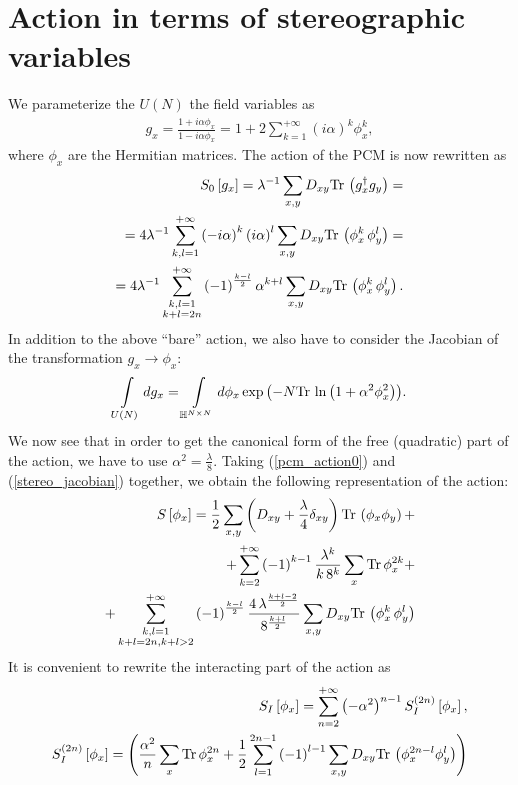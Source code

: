 \documentclass[12pt]{article}
\newcommand{\lr}[1]{ \left( #1 \right) }
\newcommand{\lrs}[1]{ \left[ #1 \right] }
\newcommand{\tr}{ {\rm Tr} \, }
\newcommand{\expa}[1]{ \exp{\left( #1 \right)} }
\begin{document}
\section{Action in terms of stereographic variables}
\label{sec:action_stereo}


 We parameterize the $U\lr{N}$ the field variables as
\begin{eqnarray}
\label{stereographic_projection}
 g_x
 =
 \frac{1 + i \alpha \phi_x}{1 - i \alpha \phi_x}
 =
 1 + 2 \sum\limits_{k=1}^{+\infty} \lr{i \alpha}^k \phi_x^k
,
\end{eqnarray}
where $\phi_x$ are the Hermitian matrices. The action of the PCM is now rewritten as
\begin{eqnarray}
\label{pcm_action0}
 S_0\lrs{g_x} = \lambda^{-1} \sum\limits_{x,y} D_{x y} \tr\lr{g^{\dag}_x g_y}
 = \nonumber\\ =
 4 \lambda^{-1} \sum\limits_{k,l=1}^{+\infty} \lr{-i \alpha}^k \lr{i \alpha}^l
      \sum\limits_{x,y} D_{xy} \tr\lr{\phi_x^k \, \phi_y^l}
 = \nonumber\\ =
 4 \lambda^{-1} \sum\limits_{\substack{k,l=1\\k+l=2 n}}^{+\infty}
  \lr{-1}^{\frac{k-l}{2}} \alpha^{k+l}
       \sum\limits_{x,y} D_{xy} \tr\lr{\phi_x^k \, \phi_y^l} .
\end{eqnarray}
In addition to the above ``bare'' action, we also have to consider the Jacobian of the transformation $g_x \rightarrow \phi_x$:
\begin{eqnarray}
\label{stereo_jacobian}
 \int\limits_{U\lr{N}} dg_x = \int\limits_{\mathbb{H}^{N\times N}} d\phi_x \expa{-N \tr\ln\lr{1 + \alpha^2 \phi_x^2}} .
\end{eqnarray}
We now see that in order to get the canonical form of the free (quadratic) part of the action, we have to use $\alpha^2 = \frac{\lambda}{8}$. Taking (\ref{pcm_action0}) and (\ref{stereo_jacobian}) together, we obtain the following representation of the action:
\begin{eqnarray}
\label{pcm_action}
 S\lrs{\phi_x} =
 \frac{1}{2} \sum\limits_{x,y} \lr{D_{xy} + \frac{\lambda}{4} \delta_{x y}} \tr\lr{\phi_x \phi_y}
 + \nonumber \\ +
 \sum\limits_{k=2}^{+\infty} \lr{-1}^{k-1} \frac{\lambda^{k}}{k \, 8^k} \sum\limits_x \tr \phi_x^{2 k}
 + \nonumber \\ +
 \sum\limits_{\substack{k,l=1\\k+l=2 n,k+l>2}}^{+\infty}
  \lr{-1}^{\frac{k-l}{2}} \frac{4 \, \lambda^{\frac{k+l-2}{2}}}{8^{\frac{k+l}{2}}}
       \sum\limits_{x,y} D_{xy} \tr\lr{\phi_x^k \, \phi_y^l}
\end{eqnarray}
It is convenient to rewrite the interacting part of the action as
\begin{eqnarray}
\label{pcm_action_int}
 S_I\lrs{\phi_x}
 = \sum\limits_{n=2}^{+\infty} \lr{- \alpha^2}^{n-1} S_I^{\lr{2 n}}\lrs{\phi_x} ,
 \nonumber \\
 S_I^{\lr{2 n}}\lrs{\phi_x} =
 \lr{
  \frac{\alpha^2}{n} \sum\limits_x \tr \phi_x^{2 n}
  +
  \frac{1}{2} \sum\limits_{l=1}^{2 n - 1} \lr{-1}^{l-1}
  \sum\limits_{x,y} D_{x y} \tr\lr{\phi_x^{2 n - l} \phi_y^l }
 }
\end{eqnarray}
\end{document}
